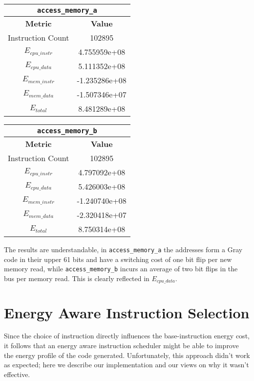 \begin{table}[htbp]
  \begin{tabular}{ | c | c | }
    \hline
    \multicolumn{2}{|c|}{\texttt{access\_memory\_a}} \\
    \hline

    \textbf{Metric} & \textbf{Value} \\
    \hline

    Instruction Count &  102895 \\
    $E_{cpu\_instr}$ & 4.755959e+08 \\
    $E_{cpu\_data}$ & 5.111352e+08 \\
    $E_{mem\_instr}$ &  -1.235286e+08 \\
    $E_{mem\_data}$ & -1.507346e+07 \\
    $E_{total}$ & 8.481289e+08 \\
    \hline
  \end{tabular}
  \quad
  \begin{tabular}{ | c | c | }
    \hline
    \multicolumn{2}{|c|}{\texttt{access\_memory\_b}} \\
    \hline

    \textbf{Metric} & \textbf{Value} \\
    \hline

    Instruction Count &  102895 \\
    $E_{cpu\_instr}$ &  4.797092e+08 \\
    $E_{cpu\_data}$ &  5.426003e+08 \\
    $E_{mem\_instr}$ &  -1.240740e+08 \\
    $E_{mem\_data}$ &  -2.320418e+07 \\
    $E_{total}$ & 8.750314e+08 \\
    \hline
  \end{tabular}
\end{table}

The results are understandable, in \texttt{access\_memory\_a} the
addresses form a Gray code in their upper 61 bits and have a switching
cost of one bit flip per new memory read, while
\texttt{access\_memory\_b} incurs an average of two bit flips in the
bus per memory read.  This is clearly reflected in $E_{cpu\_data}$.

\section{Energy Aware Instruction Selection}

Since the choice of instruction directly influences the
base-instruction energy cost, it follows that an energy aware
instruction scheduler might be able to improve the energy profile of
the code generated.  Unfortunately, this approach didn't work as
expected; here we describe our implementation and our views on why it
wasn't effective.

